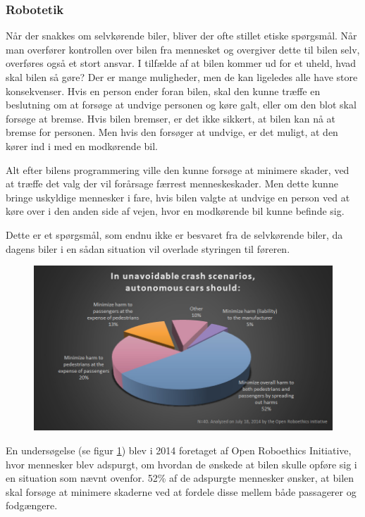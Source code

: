 \subsubsection{Robotetik}
	Når der snakkes om selvkørende biler, bliver der ofte stillet etiske spørgsmål. Når man overfører kontrollen over bilen fra mennesket og overgiver dette til bilen selv, overføres også et stort ansvar. I tilfælde af at bilen kommer ud for et uheld, hvad skal bilen så gøre? Der er mange muligheder, men de kan ligeledes alle have store konsekvenser. Hvis en person ender foran bilen, skal den kunne træffe en beslutning om at forsøge at undvige personen og køre galt, eller om den blot skal forsøge at bremse. Hvis bilen bremser, er det ikke sikkert, at bilen kan nå at bremse for personen. Men hvis den forsøger at undvige, er det muligt, at den kører ind i med en modkørende bil. 

	Alt efter bilens programmering ville den kunne forsøge at minimere skader, ved at træffe det valg der vil forårsage færrest menneskeskader. Men dette kunne bringe uskyldige mennesker i fare, hvis bilen valgte at undvige en person ved at køre over i den anden side af vejen, hvor en modkørende bil kunne befinde sig. 
	
	Dette er et spørgsmål, som endnu ikke er besvaret fra de selvkørende biler, da dagens biler i en sådan situation vil overlade styringen til føreren. 
	\begin{figure}[h!]
		\centering
		\includegraphics[width=\textwidth]{images/roboethics-2.jpg}
		\label{fig:etik_accident}
	\end{figure}
	En undersøgelse (se figur \ref{fig:etik_accident}) blev i 2014 foretaget af Open Roboethics Initiative, hvor mennesker blev adspurgt, om hvordan de ønskede at bilen skulle opføre sig i en situation som nævnt ovenfor. 52\% af de adspurgte mennesker ønsker, at bilen skal forsøge at minimere skaderne ved at fordele disse mellem både passagerer og fodgængere. 

